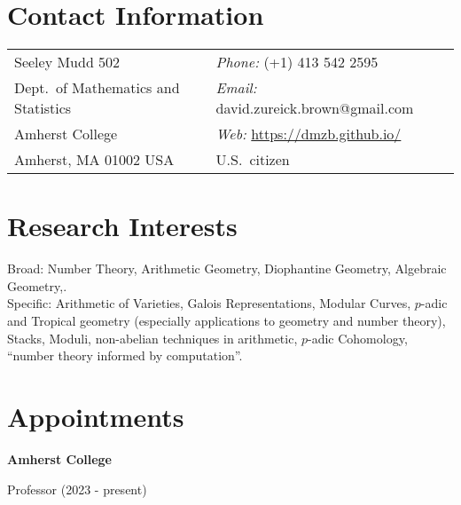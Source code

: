 \documentclass[margin,line]{res}
\newcommand{\defi}[1]{\textsf{#1}} 				%
\newenvironment{list1}{
  \begin{list}{\ding{113}}{%
      \setlength{\itemsep}{0in}
      \setlength{\parsep}{0in} \setlength{\parskip}{0in}
      \setlength{\topsep}{0in} \setlength{\partopsep}{0in}
      \setlength{\leftmargin}{0.17in}}}{\end{list}}
\begin{document}

\begin{resume}
\section{\sc Contact Information}
\vspace{.05in}
\begin{tabular}{@{}p{3in}p{4in}}
Seeley Mudd 502                            & \emph{Phone:} (+1) 413 542 2595 \\
Dept.~of Mathematics and Statistics          & \emph{Email:} david.zureick.brown@gmail.com\\
Amherst College   & \emph{Web:} \url{https://dmzb.github.io/} \\
Amherst, MA 01002 USA               & U.S.~citizen
\end{tabular}



\section{\sc Research Interests}
 \defi{Broad}: Number Theory, Arithmetic Geometry, Diophantine Geometry, Algebraic Geometry,.\\
 \defi{Specific}: Arithmetic of Varieties, Galois Representations, Modular Curves, $p$-adic and Tropical geometry (especially applications to geometry and number theory), Stacks, Moduli, non-abelian techniques in arithmetic, $p$-adic Cohomology, ``number theory informed by computation''.

\section{\sc Appointments}

{\bf Amherst College } \\
  \vspace*{-.15in}
  \begin{list1}
  \item[] Professor (2023 - present)


  \end{list1}
\vspace{-7pt}


\end{resume}
\end{document}
